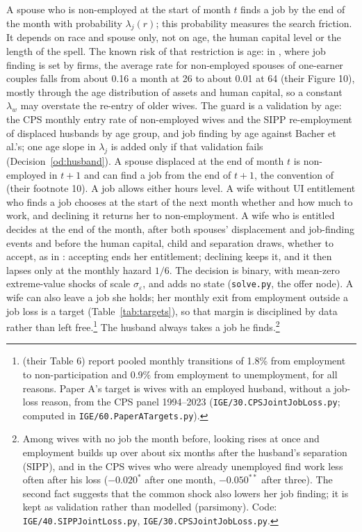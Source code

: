 \documentclass[11pt]{article}
\newcommand{\code}[1]{\texttt{#1}}
\newcommand{\1}{\mathbf{1}}
\begin{document}
A spouse who is non-employed at the start of month $t$ finds a job by the end of the month with probability
$\lambda_j(r)$; this probability measures the search friction. It depends on race and spouse only, not on age, the human
capital level or the length of the spell. The known risk of that restriction is age: in \citet{bacher2025joint}, where
job finding is set by firms, the average rate for non-employed spouses of one-earner couples falls from about 0.16 a
month at 26 to about 0.01 at 64 (their Figure 10), mostly through the age distribution of assets and human capital, so a
constant $\lambda_w$ may overstate the re-entry of older wives. The guard is a validation by age: the CPS monthly entry
rate of non-employed wives and the SIPP re-employment of displaced husbands by age group, and job finding by age against
Bacher et al.'s; one age slope in $\lambda_j$ is added only if that validation fails (Decision~\ref{od:husband}). A
spouse displaced at the end of month $t$ is non-employed in $t+1$ and can find a job from the end of $t+1$, the
convention of \citet{bacher2025joint} (their footnote 10). A job allows either hours level. A wife without UI
entitlement who finds a job chooses at the start of the next month whether and how much to work, and declining it
returns her to non-employment. A wife who is entitled decides at the end of the month, after both spouses'
displacement and job-finding events and before the human capital, child and separation draws, whether to accept, as
in \citet{bacher2025joint}: accepting ends her entitlement; declining keeps it, and it then lapses only at the monthly
hazard $1/6$. The decision is binary, with mean-zero extreme-value shocks of scale $\sigma_\varepsilon$, and adds no
state (\code{solve.py}, the offer node). A wife can also leave a job she holds; her monthly exit from employment
outside a job loss is a target (Table~\ref{tab:targets}), so that margin is disciplined by data rather than left
free.\footnote{\citet{bacher2025joint} (their Table 6) report pooled monthly transitions of 1.8\% from employment to
non-participation and 0.9\% from employment to unemployment, for all reasons. Paper A's target is wives with an employed
husband, without a job-loss reason, from the CPS panel 1994--2023 (\code{IGE/30.CPSJointJobLoss.py}; computed in
\code{IGE/60.PaperATargets.py}).} The husband always takes a job he finds.\footnote{Among wives with no job
the month before, looking rises at once and employment builds up over about six months after the husband's separation
(SIPP), and in the CPS wives who were already unemployed find work less often after his loss ($-0.020^{*}$ after one
month, $-0.050^{**}$ after three). The second fact suggests that the common shock also lowers her job finding; it is
kept as validation rather than modelled (parsimony). Code: \code{IGE/40.SIPPJointLoss.py},
\code{IGE/30.CPSJointJobLoss.py}.}
\end{document}
